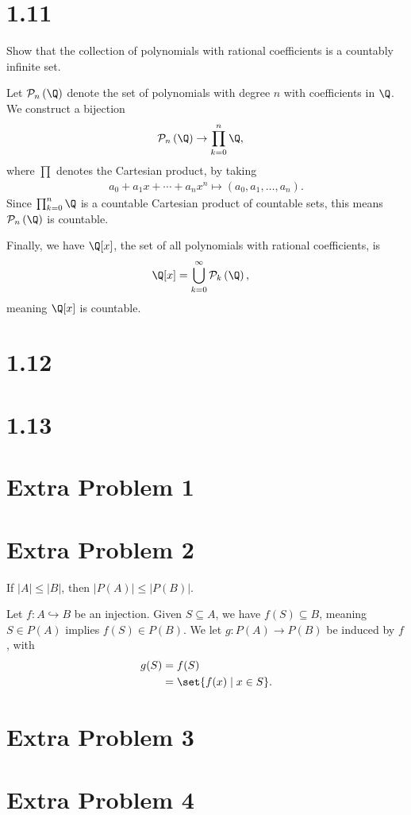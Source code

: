 \documentclass[10pt]{mypackage}
\begin{document}
\section{1.11}%
\begin{problem}
  Show that the collection of polynomials with rational coefficients is a countably infinite set.
\end{problem}
\begin{solution}
  Let $\mathcal{P}_n\left(\Q\right)$ denote the set of polynomials with degree $n$ with coefficients in $\Q$. We construct a bijection
  \begin{align*}
    \mathcal{P}_n\left(\Q\right) &\rightarrow \prod_{k=0}^{n}\Q,
  \end{align*}
  where $\prod$ denotes the Cartesian product, by taking
  \begin{align*}
    a_0 + a_1x + \cdots + a_nx^n \mapsto \left(a_0,a_1,\dots,a_n\right).
  \end{align*}
  Since $\prod_{k=0}^{n}\Q$ is a countable Cartesian product of countable sets, this means $\mathcal{P}_n\left(\Q\right)$ is countable.\newline

  Finally, we have $\Q[x]$, the set of all polynomials with rational coefficients, is
  \begin{align*}
    \Q[x] &= \bigcup_{k=0}^{\infty}\mathcal{P}_k\left(\Q\right),
  \end{align*}
  meaning $\Q[x]$ is countable.
\end{solution}
\section{1.12}%
\section{1.13}%
\section{Extra Problem 1}%
\section{Extra Problem 2}%
\begin{problem}
  If $|A| \leq |B|$, then $|P(A)| \leq |P(B)|$.
\end{problem}
\begin{solution}
  Let $f: A\hookrightarrow B$ be an injection. Given $S\subseteq A$, we have $f(S) \subseteq B$, meaning $S\in P(A)$ implies $f(S)\in P(B)$. We let $g: P(A)\rightarrow P(B)$ be induced by $f$, with 
  \begin{align*}
    g(S) &= f(S)\\
         &= \set{f(x)\mid x\in S}.
  \end{align*}
\end{solution}
\section{Extra Problem 3}%
\section{Extra Problem 4}%
\end{document}
